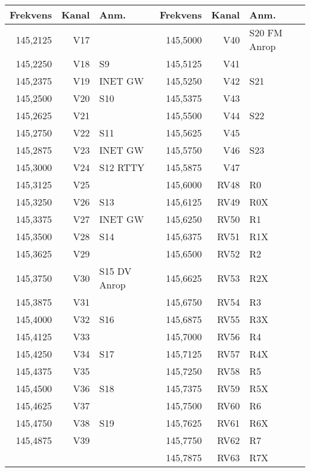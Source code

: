 \begin{longtable}{rrl|rrl}
	Frekvens & Kanal & Anm.          & Frekvens & Kanal & Anm.          \\ \hline
	145,2125 &   V17 &               & 145,5000 &   V40 & S20  FM Anrop \\
	145,2250 &   V18 & S9            & 145,5125 &   V41 &  \\
	145,2375 &   V19 & INET GW       & 145,5250 &   V42 & S21           \\
	145,2500 &   V20 & S10           & 145,5375 &   V43 &  \\
	145,2625 &   V21 &               & 145,5500 &   V44 & S22           \\
	145,2750 &   V22 & S11           & 145,5625 &   V45 &  \\
	145,2875 &   V23 & INET GW       & 145,5750 &   V46 & S23           \\
	145,3000 &   V24 & S12  RTTY     & 145,5875 &   V47 &  \\
	145,3125 &   V25 &               & 145,6000 &  RV48 & R0            \\
	145,3250 &   V26 & S13           & 145,6125 &  RV49 & R0X           \\
	145,3375 &   V27 & INET GW       & 145,6250 &  RV50 & R1            \\
	145,3500 &   V28 & S14           & 145,6375 &  RV51 & R1X           \\
	145,3625 &   V29 &               & 145,6500 &  RV52 & R2            \\
	145,3750 &   V30 & S15  DV Anrop & 145,6625 &  RV53 & R2X           \\
	145,3875 &   V31 &               & 145,6750 &  RV54 & R3            \\
	145,4000 &   V32 & S16           & 145,6875 &  RV55 & R3X           \\
	145,4125 &   V33 &               & 145,7000 &  RV56 & R4            \\
	145,4250 &   V34 & S17           & 145,7125 &  RV57 & R4X           \\
	145,4375 &   V35 &               & 145,7250 &  RV58 & R5            \\
	145,4500 &   V36 & S18           & 145,7375 &  RV59 & R5X           \\
	145,4625 &   V37 &               & 145,7500 &  RV60 & R6            \\
	145,4750 &   V38 & S19           & 145,7625 &  RV61 & R6X           \\
	145,4875 &   V39 &               & 145,7750 &  RV62 & R7            \\
	         &       &               & 145,7875 &  RV63 & R7X
\end{longtable}

